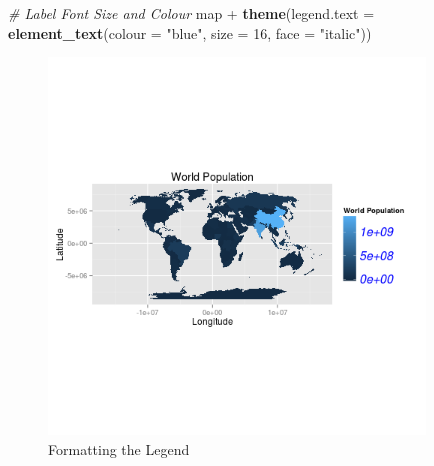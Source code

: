\documentclass[]{article}
\newenvironment{Shaded}{}{}
\newcommand{\KeywordTok}[1]{\textcolor[rgb]{0.00,0.44,0.13}{\textbf{{#1}}}}
\newcommand{\DataTypeTok}[1]{\textcolor[rgb]{0.56,0.13,0.00}{{#1}}}
\newcommand{\DecValTok}[1]{\textcolor[rgb]{0.25,0.63,0.44}{{#1}}}
\newcommand{\StringTok}[1]{\textcolor[rgb]{0.25,0.44,0.63}{{#1}}}
\newcommand{\CommentTok}[1]{\textcolor[rgb]{0.38,0.63,0.69}{\textit{{#1}}}}
\newcommand{\NormalTok}[1]{{#1}}
\let\Oldincludegraphics\includegraphics
\renewcommand{\includegraphics}[1]{\Oldincludegraphics[width=10cm]{#1}}
\begin{document}
\begin{Shaded}
\begin{Highlighting}[]

\CommentTok{# Label Font Size and Colour}
\NormalTok{map + }\KeywordTok{theme}\NormalTok{(}\DataTypeTok{legend.text =} \KeywordTok{element_text}\NormalTok{(}\DataTypeTok{colour =} \StringTok{"blue"}\NormalTok{, }\DataTypeTok{size =} \DecValTok{16}\NormalTok{, }\DataTypeTok{face =} \StringTok{"italic"}\NormalTok{))}
\end{Highlighting}
\end{Shaded}
\begin{figure}[htbp]
\centering
\includegraphics{figure/Formatting_the_Legend3.png}
\caption{Formatting the Legend}
\end{figure}
\end{document}
